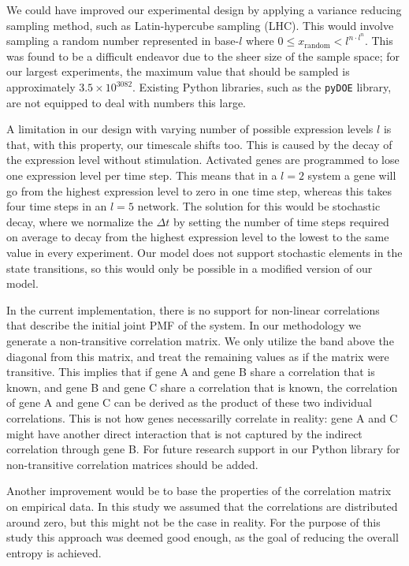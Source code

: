 \documentclass[../main.tex]{subfiles}
\begin{document}
We could have improved our experimental design by applying a variance reducing sampling method, such as Latin-hypercube sampling (LHC).
This would involve sampling a random number represented in base-$l$ where $0 \le x_\mathrm{random} < l^{n \cdot l^n}$.
This was found to be a difficult endeavor due to the sheer size of the sample space; for our largest experiments, the maximum value that should be sampled is approximately $3.5 \times 10^{3082}$.
Existing Python libraries, such as the \texttt{pyDOE} library, are not equipped to deal with numbers this large.

A limitation in our design with varying number of possible expression levels $l$ is that, with this property, our timescale shifts too.
This is caused by the decay of the expression level without stimulation.
Activated genes are programmed to lose one expression level per time step.
This means that in a $l=2$ system a gene will go from the highest expression level to zero in one time step, whereas this takes four time steps in an $l=5$ network.
The solution for this would be stochastic decay, where we normalize the $\Delta t$ by setting the number of time steps required on average to decay from the highest expression level to the lowest to the same value in every experiment.
Our model does not support stochastic elements in the state transitions, so this would only be possible in a modified version of our model.

In the current implementation, there is no support for non-linear correlations that describe the initial joint PMF of the system.
In our methodology we generate a non-transitive correlation matrix.
We only utilize the band above the diagonal from this matrix, and treat the remaining values as if the matrix were transitive.
This implies that if gene A and gene B share a correlation that is known, and gene B and gene C share a correlation that is known, the correlation of gene A and gene C can be derived as the product of these two individual correlations.
This is not how genes necessarilly correlate in reality: gene A and C might have another direct interaction that is not captured by the indirect correlation through gene B.
For future research support in our Python library for non-transitive correlation matrices should be added.

Another improvement would be to base the properties of the correlation matrix on empirical data.
In this study we assumed that the correlations are distributed around zero, but this might not be the case in reality.
For the purpose of this study this approach was deemed good enough, as the goal of reducing the overall entropy is achieved.
\end{document}
